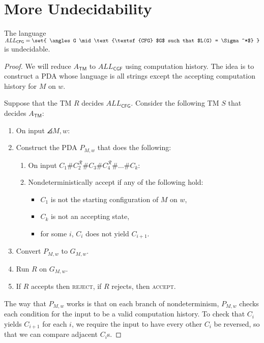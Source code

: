 \documentclass{standalone}
\begin{document}
\section{More Undecidability}
\begin{proposition}
	The language \(\mathit{ALL}_{\textsf{CFG}} = \set{
		\angles G \mid \text{\textsf{CFG} $G$ such that $L(G) = \Sigma^*$}
	}\) is undecidable.
\end{proposition}
\begin{proof}
	We will reduce \(A_{\textsf{TM}}\) to \(\textit{ALL}_{\textsf{CGF}}\) using computation history. The idea is to construct a \textsf{PDA} whose language is all strings except the accepting computation history for \(M\) on \(w\).

	Suppose that the \textsf{TM} \(R\) decides \(\textit{ALL}_{\textsf{CFG}}\). Consider the following \textsf{TM} \(S\) that decides \(A_{\textsf{TM}}\):
	\begin{enumerate}[start=0]
		\item On input \(\angles{M, w}\):
		\item Construct the \textsf{PDA} \(P_{M, w}\) that does the following:
		\begin{enumerate}[(1), start=0, nosep]
			\item On input \(C_1 \texttt\# C_2^{\mathcal R} \texttt\# C_3 \texttt\# C_4^{\mathcal R} \texttt\# \dots \texttt\# C_k\):
			\item Nondeterministically accept if any of the following hold:
			\begin{itemize}[nosep]
				\item \(C_1\) is not the starting configuration of \(M\) on \(w\),
				\item \(C_k\) is not an accepting state,
				\item for some \(i\), \(C_i\) does not yield \(C_{i + 1}\).
			\end{itemize}
		\end{enumerate}
		\item Convert \(P_{M, w}\) to \(G_{M, w}\).
		\item Run \(R\) on \(G_{M, w}\).
		\item If \(R\) accepts then \textsc{reject}, if \(R\) rejects, then \textsc{accept}.
	\end{enumerate}

	The way that \(P_{M, w}\) works is that on each branch of nondeterminism, \(P_{M, w}\) checks each condition for the input to be a valid computation history. To check that \(C_i\) yields \(C_{i + 1}\) for each \(i\), we require the input to have every other \(C_i\) be reversed, so that we can compare adjacent \(C_i\)s.
\end{proof}
\end{document}
